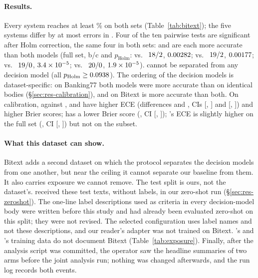 \paragraph{Results.} Every system reaches at least \btFlashSubAcc\% on both sets (Table~\ref{tab:bitext}); the five
systems differ by at most \btFlashErr{} errors in \btN. Four of the ten pairwise tests are significant after Holm
correction, the same four in both sets: \jev{} and \pplx{} are each more accurate than both \clef{} models (full set, b/c and
$p_\text{Holm}$: \jev{} vs.\ \clef{} $18/2$, $0.00282$; \jev{} vs.\ \flash{}
$19/2$, $0.00177$; \pplx{} vs.\ \clef{} $19/0$,
$3.4\times10^{-5}$; \pplx{} vs.\ \flash{} $20/0$, $1.9\times10^{-5}$). \orb{} cannot be separated from any decision model
(all $p_\text{Holm}\ge0.0938$). The ordering of the decision models is dataset-specific: on Banking77
both \clef{} models were more accurate than \jev{} on identical bodies (\S\ref{sec:res-calibration}), and on Bitext
\jev{} is more accurate than both. On calibration, against \orb, \clef{}
and \flash{} have higher ECE (differences \btClefEceDiff{} and \btFlashEceDiff, CIs [\btClefEceDiffLo,
\btClefEceDiffHi] and [\btFlashEceDiffLo, \btFlashEceDiffHi]) and higher Brier scores; \pplx{} has a lower Brier
score (\btPplxBrierDiff, CI [\btPplxBrierDiffLo, \btPplxBrierDiffHi]); \jev's ECE is slightly higher on the full set
(\btJevEceDiff, CI [\btJevEceDiffLo, \btJevEceDiffHi]) but not on the subset.

\paragraph{What this dataset can show.} Bitext adds a second dataset on which the protocol separates the decision
models from one another, but near the ceiling it cannot separate our baseline from them. It also carries exposure
we cannot remove. The test split is ours, not the dataset's. \jev{} received these test texts, without labels, in
our zero-shot run (\S\ref{sec:res-zeroshot}). The one-line label descriptions used as criteria in every decision-model
body were written before this study and had already been evaluated zero-shot on this split; they were not revised.
The selected \orb{} configuration uses label names and not these descriptions, and our reader's adapter was not
trained on Bitext. \clef's and \pplx's training data
do not document Bitext (Table~\ref{tab:exposure}). Finally, after the analysis script was committed, the operator
saw the headline summaries of two arms before the joint analysis run; nothing was changed afterwards, and the run log
records both events.


